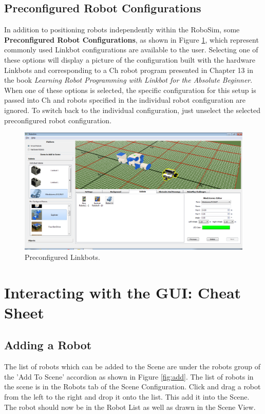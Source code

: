 \documentclass{article}
\begin{document}
\subsection{Preconfigured Robot Configurations}
In addition to positioning robots independently within the RoboSim, some {\bf
Preconfigured Robot Configurations}, as shown in Figure \ref{fig:preconfig},
which represent commonly used Linkbot configurations  are available to the user.
Selecting one of these options will display a picture of the configuration built
with the hardware Linkbots and corresponding to a Ch robot program presented in
Chapter 13 in the book {\em Learning Robot Programming with Linkbot for the
Absolute Beginner}.  When one of these options is selected, the specific
configuration for this setup is passed into Ch and robots specified in the
individual robot configuration are ignored.  To switch back to the individual
configuration, just unselect the selected preconfigured robot configuration.
\begin{figure}[H]
	\begin{center}
		\includegraphics[width=6in]{pictures/gui_preconfig}
	\end{center}
	\caption{Preconfigured Linkbots.}
	\label{fig:preconfig}
\end{figure}
\fi

%
%
\section{Interacting with the GUI: Cheat Sheet}
\subsection{Adding a Robot}
The list of robots which can be added to the Scene are under the robots group
of the 'Add To Scene' accordion as shown in Figure \ref{fig:add}.  The list of
robots in the scene is in the Robots tab of the Scene Configuration.  Click and
drag a robot from the left to the right and drop it onto the list.  This add it
into the Scene.  The robot should now be in the Robot List as well as drawn in
the Scene View.
\end{document}
